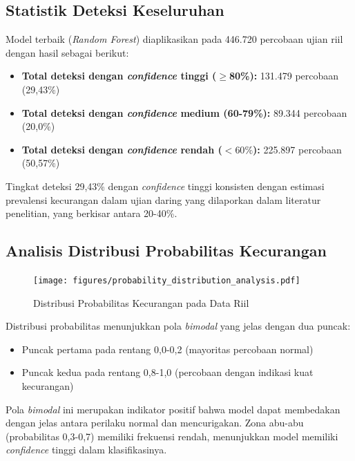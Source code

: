 \subsection{Statistik Deteksi Keseluruhan}
\label{subsec:statistikDeteksiKeseluruhan}

Model terbaik (\textit{Random Forest}) diaplikasikan pada 446.720 percobaan ujian riil dengan hasil sebagai berikut:

\begin{itemize}
    \item \textbf{Total deteksi dengan \textit{confidence} tinggi ($\geq$80\%):} 131.479 percobaan (29,43\%)
    \item \textbf{Total deteksi dengan \textit{confidence} medium (60-79\%):} 89.344 percobaan (20,0\%)
    \item \textbf{Total deteksi dengan \textit{confidence} rendah ($<60\%$):} 225.897 percobaan (50,57\%)
\end{itemize}

Tingkat deteksi 29,43\% dengan \textit{confidence} tinggi konsisten dengan estimasi prevalensi kecurangan dalam ujian daring yang dilaporkan dalam literatur penelitian, yang berkisar antara 20-40\%.

\subsection{Analisis Distribusi Probabilitas Kecurangan}
\label{subsec:analisisDistribusiProbabilitas}

\begin{figure}[htbp]
    \centering
    \texttt{[image: figures/probability\_distribution\_analysis.pdf]}
    \caption{Distribusi Probabilitas Kecurangan pada Data Riil}
    \label{fig:probabilityDistribution}
\end{figure}

Distribusi probabilitas menunjukkan pola \textit{bimodal} yang jelas dengan dua puncak:
\begin{itemize}
    \item Puncak pertama pada rentang 0,0-0,2 (mayoritas percobaan normal)
    \item Puncak kedua pada rentang 0,8-1,0 (percobaan dengan indikasi kuat kecurangan)
\end{itemize}

Pola \textit{bimodal} ini merupakan indikator positif bahwa model dapat membedakan dengan jelas antara perilaku normal dan mencurigakan. Zona abu-abu (probabilitas 0,3-0,7) memiliki frekuensi rendah, menunjukkan model memiliki \textit{confidence} tinggi dalam klasifikasinya.

